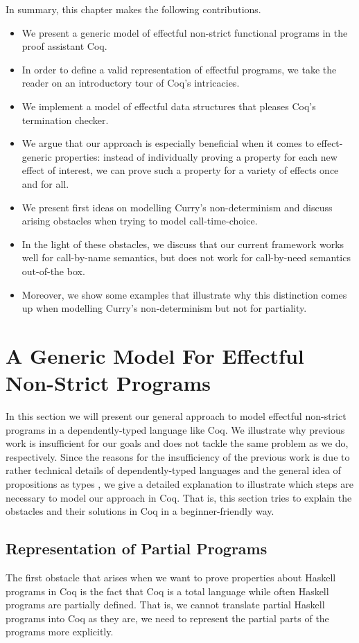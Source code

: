 In summary, this chapter makes the following contributions.

\begin{itemize}
\item We present a generic model of effectful non\--strict functional programs in the proof assistant Coq.
\item In order to define a valid representation of effectful programs, we take the reader on an introductory tour of Coq's intricacies.
\item We implement a model of effectful data structures that pleases Coq's termination checker.
\item We argue that our approach is especially beneficial when it comes to effect\--generic properties: instead of individually proving a property for each new effect of interest, we can prove such a property for a variety of effects once and for all.
\item We present first ideas on modelling Curry's non\--determinism and discuss arising obstacles when trying to model call\--time\--choice.
\item In the light of these obstacles, we discuss that our current framework works well for call\--by\--name semantics, but does not work for call\--by\--need semantics out\--of\--the box.
\item Moreover, we show some examples that illustrate why this distinction comes up when modelling Curry's non\--determinism but not for partiality.
\end{itemize}
 
\section{A Generic Model For Effectful Non\--Strict Programs}

In this section we will present our general approach to model effectful non\--strict programs in a dependently\--typed language like Coq.
We illustrate why previous work is insufficient for our goals and does not tackle the same problem as we do, respectively.
Since the reasons for the insufficiency of the previous work is due to rather technical details of dependently\--typed languages and the general idea of propositions as types \citep{wadler2015propositions}, we give a detailed explanation to illustrate which steps are necessary to model our approach in Coq.
That is, this section tries to explain the obstacles and their solutions in Coq in a beginner\--friendly way.

\subsection{Representation of Partial Programs}
\label{subsec:partial}
The first obstacle that arises when we want to prove properties about Haskell programs in Coq is the fact that Coq is a total language while often Haskell programs are partially defined.
That is, we cannot translate partial Haskell programs into Coq as they are, we need to represent the partial parts of the programs more explicitly.

